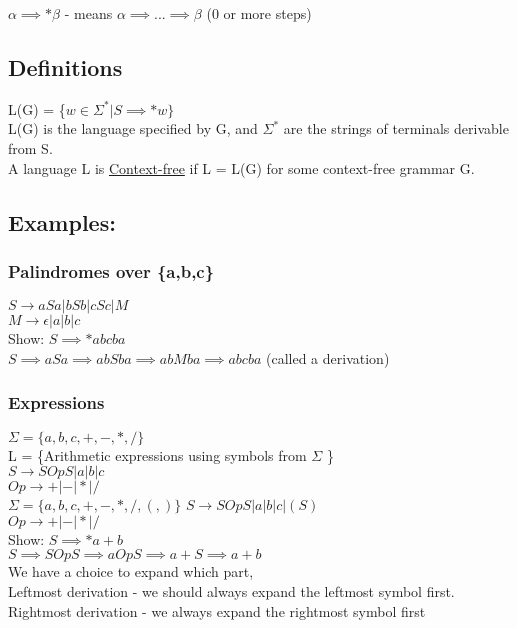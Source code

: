 \documentclass[12pt]{article}
\begin{document}
	$\alpha \implies *\beta$ - means $\alpha \implies ... \implies \beta$ (0 or more steps)\\
	
	\subsection*{Definitions}
	L(G) = \{$w \in \Sigma^* | S \implies *w \}$\\
	L(G) is the language specified by G, and $\Sigma^*$ are the strings of terminals derivable from S.\\
	
	A language L is \underline{Context-free} if L = L(G) for some context-free grammar G.\\
	
	\subsection*{Examples:}
	\subsubsection*{Palindromes over \{a,b,c\}}
	$S \rightarrow aSa | bSb | cSc | M$\\
	$M \rightarrow \epsilon | a | b | c$\\
	
	Show: $S \implies *abcba$\\
	$S \implies aSa \implies abSba \implies abMba \implies abcba$ (called a derivation)\\
	
	\subsubsection*{Expressions}
	$\Sigma = \{a,b,c,+,-,*,/\}$\\
	L = \{Arithmetic expressions using symbols from $\Sigma$ \}\\
	$S \rightarrow SOpS | a | b | c$\\
	$Op \rightarrow +|-|*|/$\\
	
	$\Sigma = \{a,b,c,+,-,*,/,(,)\}$
	$S \rightarrow SOpS | a | b | c | (S)$\\
	$Op \rightarrow + | - | * | /$\\
	
	Show: $S \implies *a+b$\\
	$S \implies SOpS \implies aOpS \implies a+S \implies a+b$\\
	We have a choice to expand which part, \\
	Leftmost derivation -  we should always expand the leftmost symbol first.\\
	Rightmost derivation - we always expand the rightmost symbol first\\
	
	
\end{document}
